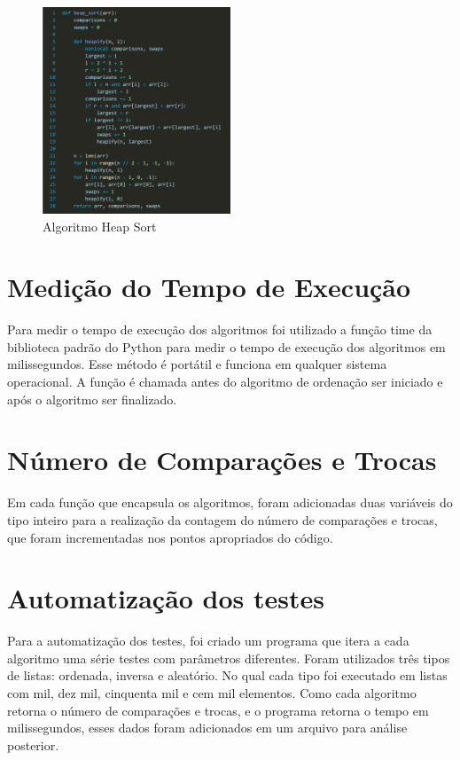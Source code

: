 \documentclass[tcc2]{uftex}
\begin{document}
\begin{figure}[h!]
    \centering
    \includegraphics[width=0.5\textwidth]{heap_sort.png}  %
    \caption{Algoritmo Heap Sort}
    \label{fig:exemplo}
\end{figure}


\section{Medição do Tempo de Execução}

Para medir o tempo de execução dos algoritmos foi utilizado a função time da biblioteca padrão do Python para medir o tempo de execução dos algoritmos em milissegundos. Esse método é portátil e funciona em qualquer sistema operacional. A função é chamada antes do algoritmo de ordenação ser iniciado e após o algoritmo ser finalizado.


\section{Número de Comparações e Trocas}
Em cada função que encapsula os algoritmos, foram adicionadas duas variáveis do tipo inteiro para a realização da contagem do número de comparações e trocas, que foram incrementadas nos pontos apropriados do código.


\section{Automatização dos testes}
Para a automatização dos testes, foi criado um programa que itera a cada algoritmo uma série testes com parâmetros diferentes. Foram utilizados três tipos de listas: ordenada, inversa e aleatório. No qual cada tipo foi executado em listas com mil, dez mil, cinquenta mil e cem mil elementos.
Como cada algoritmo retorna o número de comparações e trocas, e o programa retorna o tempo em milissegundos, esses dados foram adicionados em um arquivo para análise posterior.
\end{document}
